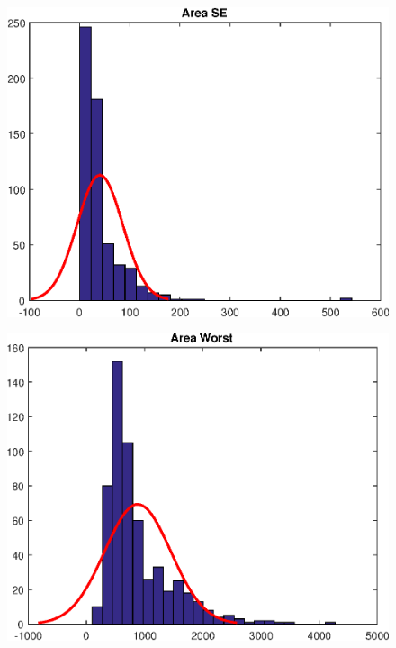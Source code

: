 \documentclass{beamer}
\begin{document}
\begin{frame}
\begin{figure}[H]
\centering
\begin{minipage}{.3\textwidth}
  \centering
  \includegraphics[width=\linewidth]{./img/area_se}
  \label{fig:test1}
\end{minipage}%
\begin{minipage}{.3\textwidth}
  \centering
  \includegraphics[width=\linewidth]{./img/area_worst}
  \label{fig:test2}
\end{minipage}
\end{figure}
\end{frame}
\end{document}
